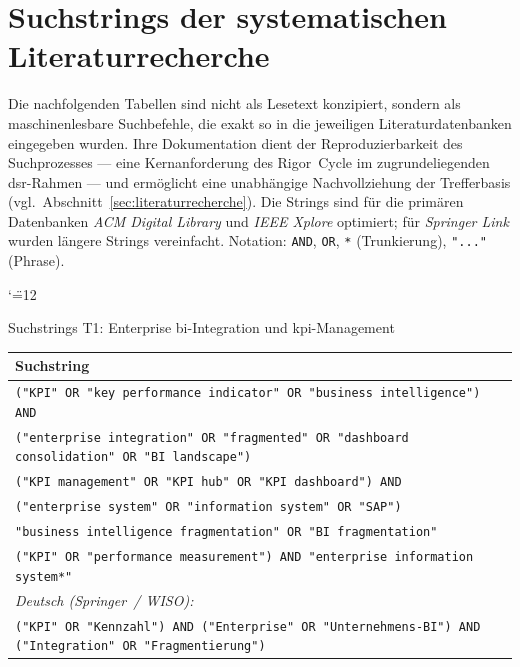 \section{Suchstrings der systematischen Literaturrecherche}
\label{apx:suchstrings}

Die nachfolgenden Tabellen sind nicht als Lesetext konzipiert, sondern als maschinenlesbare Suchbefehle, die exakt so in die jeweiligen Literaturdatenbanken eingegeben wurden.
Ihre Dokumentation dient der Reproduzierbarkeit des Suchprozesses — eine Kernanforderung des Rigor~Cycle im zugrundeliegenden \gls{dsr}-Rahmen — und ermöglicht eine unabhängige Nachvollziehung der Trefferbasis (vgl.\ Abschnitt~\ref{sec:literaturrecherche}).
Die Strings sind für die primären Datenbanken \textit{ACM Digital Library} und \textit{IEEE Xplore} optimiert; für \textit{Springer Link} wurden längere Strings vereinfacht.
Notation: \texttt{AND}, \texttt{OR}, \texttt{*} (Trunkierung), \texttt{"..."} (Phrase).

\begingroup\catcode`\"=12

\begin{batable}[label=tab:suchstrings-t1]{Suchstrings T1: Enterprise \gls{bi}-Integration und \gls{kpi}-Management}
\small\setlength{\tabcolsep}{6pt}\renewcommand{\arraystretch}{1.4}
\begin{tabular}{|p{}|}
\hline
\textbf{Suchstring} \\
\hline
\texttt{("KPI" OR "key performance indicator" OR "business intelligence") AND} \\
\texttt{("enterprise integration" OR "fragmented" OR "dashboard consolidation" OR "BI landscape")} \\[4pt]
\texttt{("KPI management" OR "KPI hub" OR "KPI dashboard") AND} \\
\texttt{("enterprise system" OR "information system" OR "SAP")} \\[4pt]
\texttt{"business intelligence fragmentation" OR "BI fragmentation"} \\[4pt]
\texttt{("KPI" OR "performance measurement") AND "enterprise information system*"} \\[4pt]
\textit{Deutsch (Springer~/ WISO):} \\
\texttt{("KPI" OR "Kennzahl") AND ("Enterprise" OR "Unternehmens-BI") AND ("Integration" OR "Fragmentierung")} \\
\hline
\end{tabular}
\end{batable}

